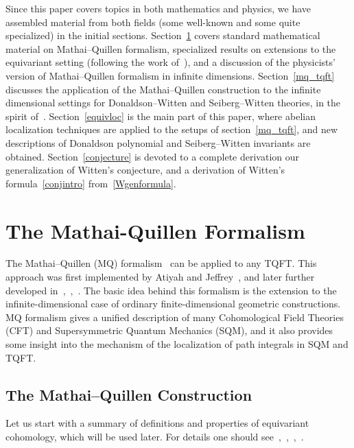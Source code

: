 \documentclass[a4paper,12pt,reqno,sumlimits]{amsart}
\theoremstyle{plain}
\theoremstyle{definition}
\newcommand{\1}{{\bf 1}}
\numberwithin{equation}{section}
\begin{document}
Since this paper covers topics in both mathematics and physics, we have
assembled material from both fields (some well-known and some quite
specialized) in the initial sections.  Section~\ref{mq} covers standard
mathematical material on Mathai--Quillen formalism, specialized results on
extensions to the equivariant setting (following the work of~\cite{radu}),
and a discussion of the physicists' version of Mathai--Quillen formalism in
infinite dimensions.  Section~\ref{mq_tqft} discusses the application of the
Mathai--Quillen construction to the infinite dimensional settings for
Donaldson--Witten and Seiberg--Witten theories, in the spirit of~\cite{radu}.
Section~\ref{equivloc} is the main part of this paper, where abelian
localization techniques are applied to the setups of section~\ref{mq_tqft},
and new descriptions of Donaldson polynomial and Seiberg--Witten invariants
are obtained.  Section~\ref{conjecture} is devoted to a complete derivation
our generalization of Witten's conjecture, and a derivation of Witten's
formula~\eqref{conjintro} from~\eqref{Wgenformula}.


\section{The Mathai-Quillen Formalism}
\label{mq}

The Mathai--Quillen (MQ) formalism~\cite{mq} can be applied to any TQFT. This
approach was first implemented by Atiyah and Jeffrey~\cite{aj}, and later
further developed in~\cite{blau},~\cite{radu},~\cite{cordes}.  The basic idea
behind this formalism is the extension to the infinite-dimensional case of
ordinary finite-dimensional geometric constructions.  MQ formalism gives a
unified description of many Cohomological Field Theories (CFT) and
Supersymmetric Quantum Mechanics (SQM), and it also provides some insight
into the mechanism of the localization of path integrals in SQM and TQFT.


\subsection{The Mathai--Quillen Construction}
\label{mqfinitecase}

Let us start with a summary of definitions and properties of equivariant
cohomology, which will be used later. For details one should
see~\cite{ab},~\cite{bgv},~\cite{radu},~\cite{cordes}.
\end{document}
